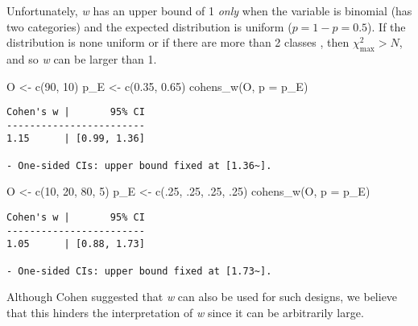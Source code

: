 \documentclass[mathematics,article,submit,moreauthors,pdftex]{mdpi}
\newenvironment{Shaded}{\begin{snugshade}}{\end{snugshade}}
\newcommand{\AttributeTok}[1]{\textcolor[rgb]{0.77,0.63,0.00}{#1}}
\newcommand{\DecValTok}[1]{\textcolor[rgb]{0.00,0.00,0.81}{#1}}
\newcommand{\FloatTok}[1]{\textcolor[rgb]{0.00,0.00,0.81}{#1}}
\newcommand{\FunctionTok}[1]{\textcolor[rgb]{0.00,0.00,0.00}{#1}}
\newcommand{\NormalTok}[1]{#1}
\newcommand{\OtherTok}[1]{\textcolor[rgb]{0.56,0.35,0.01}{#1}}
\begin{document}
Unfortunately, \emph{w} has an upper bound of 1 \emph{only} when the
variable is binomial (has two categories) and the expected distribution
is uniform (\(p = 1 - p = 0.5\)). If the distribution is none uniform
\citep{rosenberg2010generalized} or if there are more than 2 classes
\citep{johnston2006measures}, then \(\chi^2_\text{max} > N\), and so
\emph{w} can be larger than 1.

\begin{Shaded}
\begin{Highlighting}[]
\NormalTok{O }\OtherTok{\textless{}{-}} \FunctionTok{c}\NormalTok{(}\DecValTok{90}\NormalTok{, }\DecValTok{10}\NormalTok{)}
\NormalTok{p\_E }\OtherTok{\textless{}{-}} \FunctionTok{c}\NormalTok{(}\FloatTok{0.35}\NormalTok{, }\FloatTok{0.65}\NormalTok{)}
\FunctionTok{cohens\_w}\NormalTok{(O, }\AttributeTok{p =}\NormalTok{ p\_E)}
\end{Highlighting}
\end{Shaded}

\begin{verbatim}
Cohen's w |       95% CI
------------------------
1.15      | [0.99, 1.36]

- One-sided CIs: upper bound fixed at [1.36~].
\end{verbatim}

\begin{Shaded}
\begin{Highlighting}[]
\NormalTok{O }\OtherTok{\textless{}{-}} \FunctionTok{c}\NormalTok{(}\DecValTok{10}\NormalTok{, }\DecValTok{20}\NormalTok{, }\DecValTok{80}\NormalTok{, }\DecValTok{5}\NormalTok{)}
\NormalTok{p\_E }\OtherTok{\textless{}{-}} \FunctionTok{c}\NormalTok{(.}\DecValTok{25}\NormalTok{, .}\DecValTok{25}\NormalTok{, .}\DecValTok{25}\NormalTok{, .}\DecValTok{25}\NormalTok{)}
\FunctionTok{cohens\_w}\NormalTok{(O, }\AttributeTok{p =}\NormalTok{ p\_E)}
\end{Highlighting}
\end{Shaded}

\begin{verbatim}
Cohen's w |       95% CI
------------------------
1.05      | [0.88, 1.73]

- One-sided CIs: upper bound fixed at [1.73~].
\end{verbatim}

Although Cohen \citep{cohen2013statistical} suggested that \emph{w} can
also be used for such designs, we believe that this hinders the
interpretation of \emph{w} since it can be arbitrarily large.
\end{document}
